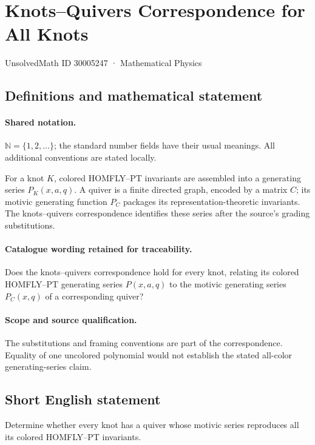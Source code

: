 \documentclass[11pt]{article}
\begin{document}
\setcounter{section}{30005246}
\section{Knots–Quivers Correspondence for All Knots}\label{30005247}
{\small UnsolvedMath ID 30005247 · Mathematical Physics}
\subsection{Definitions and mathematical statement}

\paragraph{Shared notation.}$\mathbb N=\{1,2,\ldots\}$; the standard number fields have their usual meanings. All additional conventions are stated locally.


For a knot $K$, colored HOMFLY--PT invariants are assembled into a generating series $P_K(x,a,q)$. A quiver is a finite directed graph, encoded by a matrix $C$; its motivic generating function $P_C$ packages its representation-theoretic invariants. The knots--quivers correspondence identifies these series after the source's grading substitutions.

\paragraph{Catalogue wording retained for traceability.}
Does the knots–quivers correspondence hold for every knot, relating its colored HOMFLY–PT generating series $P(x,a,q)$ to the motivic generating series $P_C(x,q)$ of a corresponding quiver?

\paragraph{Scope and source qualification.}The substitutions and framing conventions are part of the correspondence. Equality of one uncolored polynomial would not establish the stated all-color generating-series claim.
\subsection{Short English statement}
Determine whether every knot has a quiver whose motivic series reproduces all its colored HOMFLY--PT invariants.
\end{document}
